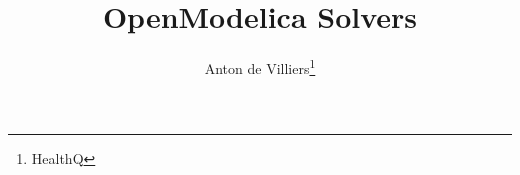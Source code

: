 \documentclass[10pt]{article}
\title{OpenModelica Solvers}
\author{Anton de Villiers\thanks{HealthQ}}
\begin{document}
\setcounter{page}{1}



\newcommand{\blokkie}{\hspace{.07cm}\Box\hspace{.07cm}}

\newcommand{\headcol}{\rowcolor{tableheadcolor}}
\newcommand{\rowcol}{\rowcolor{tablerowcolor}}

\newcommand{\topline}{\arrayrulecolor{black}\specialrule{0.1em}{\abovetopsep}{0pt}%
	\arrayrulecolor{tableheadcolor}\specialrule{\belowrulesep}{0pt}{0pt}%
	\arrayrulecolor{black}}

\newcommand{\toplinee}{\arrayrulecolor{black}\specialrule{0.1em}{\abovetopsep}{0pt}%
	\arrayrulecolor{tablerowcolor}\specialrule{\belowrulesep}{0pt}{0pt}%
	\arrayrulecolor{black}}

\newcommand{\midline}{\arrayrulecolor{tableheadcolor}\specialrule{\aboverulesep}{0pt}{0pt}%
	\arrayrulecolor{black}\specialrule{\lightrulewidth}{0pt}{0pt}%
	\arrayrulecolor{white}\specialrule{\belowrulesep}{0pt}{0pt}%
	\arrayrulecolor{black}}

\newcommand{\midlinecbw}{\arrayrulecolor{tablerowcolor}\specialrule{\aboverulesep}{0pt}{0pt}%
	\arrayrulecolor{black}\specialrule{\lightrulewidth}{0pt}{0pt}%
 	\arrayrulecolor{white}\specialrule{\belowrulesep}{0pt}{0pt}%
	\arrayrulecolor{black}}

\newcommand{\midlinecw}{\arrayrulecolor{tablerowcolor}\specialrule{\aboverulesep}{0pt}{0pt}%
	\arrayrulecolor{tablerowcolor}\specialrule{\lightrulewidth}{0pt}{0pt}%
	\arrayrulecolor{white}\specialrule{\belowrulesep}{0pt}{0pt}%
	\arrayrulecolor{black}}

\newcommand{\midlinewbc}{\arrayrulecolor{white}\specialrule{\aboverulesep}{0pt}{0pt}%
	\arrayrulecolor{black}\specialrule{\lightrulewidth}{0pt}{0pt}%
	\arrayrulecolor{tablerowcolor}\specialrule{\belowrulesep}{0pt}{0pt}%
	\arrayrulecolor{black}}

\newcommand{\midlinehr}{\arrayrulecolor{tablerowcolor}\specialrule{\aboverulesep}{0pt}{0pt}%
	\arrayrulecolor{black}\specialrule{\lightrulewidth}{0pt}{0pt}%
	\arrayrulecolor{tableheadcolor}\specialrule{\belowrulesep}{0pt}{0pt}%
	\arrayrulecolor{tablerowcolor}}
\end{document}
